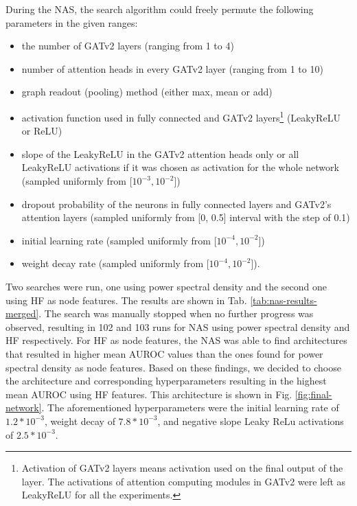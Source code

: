 \documentclass[a4paper,fleqn]{cas-sc}
\begin{document}
During the NAS, the search algorithm could freely permute the following parameters in the given ranges:
\begin{itemize}
    \item the number of GATv2 layers (ranging from 1 to 4)
    \item number of attention heads in every GATv2 layer (ranging from 1 to 10)
    \item graph readout (pooling) method (either max, mean or add) 
    \item activation function used in fully connected and GATv2 layers\footnote{Activation of GATv2 layers means activation used on the final output of the layer. The activations of attention computing modules in GATv2 were left as LeakyReLU for all the experiments.} (LeakyReLU or ReLU)
    \item slope of the LeakyReLU in the GATv2 attention heads only or all LeakyReLU activations if it was chosen as activation for the whole network (sampled uniformly from [$10^{-3}, 10^{-2}$])
    \item dropout probability of the neurons in fully connected layers and GATv2's attention layers (sampled uniformly from [0, 0.5] interval with the step of 0.1)
    \item initial learning rate (sampled uniformly from [$10^{-4}, 10^{-2}$])
    \item weight decay rate (sampled uniformly from [$10^{-4}, 10^{-2}$]).
\end{itemize}
Two searches were run, one using power spectral density and the second one using HF as node features. The results are shown in Tab. \ref{tab:nas-results-merged}. The search was manually stopped when no further progress was observed, resulting in 102 and 103 runs for NAS using power spectral density and HF respectively. For HF as node features, the NAS was able to find architectures that resulted in higher mean AUROC values than the ones found for power spectral density as node features. Based on these findings, we decided to choose the architecture and corresponding hyperparameters resulting in the highest mean AUROC using HF features. This architecture is shown in Fig. \ref{fig:final-network}. The aforementioned hyperparameters were the initial learning rate of $1.2*10^{-3}$, weight decay of $7.8*10^{-3}$, and negative slope Leaky ReLu activations of $2.5*10^{-3}$.
\end{document}
